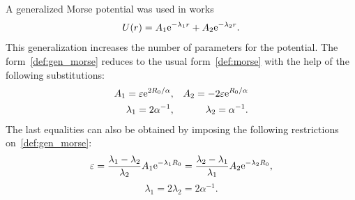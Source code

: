 \documentclass[12pt]{article}
\begin{document}
	A generalized Morse potential was used in works~\cite{BiswasHamann1985, Lim2005}
	\begin{equation}
		\label{def:gen_morse}
		U(r) = A_1 {\rm e}^{-\lambda_1 r} + A_2 {\rm e}^{-\lambda_2 r}.
	\end{equation}
	This generalization increases the number of parameters for the potential. The form~\eqref{def:gen_morse} reduces to the usual form~\eqref{def:morse} with the help of the following substitutions:
	\begin{eqnarray*}
		A_1 = \varepsilon {\rm e}^{2R_0/\alpha}, & & A_2 = -2\varepsilon {\rm e}^{R_0/\alpha}
		\\
		\lambda_1 = 2\alpha^{-1}, & & \lambda_2 = \alpha^{-1}.
	\end{eqnarray*}
	The last equalities can also be obtained by imposing the following restrictions on~\eqref{def:gen_morse}:
	\begin{equation*}
		\varepsilon = \frac{\lambda_1 - \lambda_2}{\lambda_2} A_1 {\rm e}^{-\lambda_1 R_0}
		= \frac{\lambda_2 - \lambda_1}{\lambda_1} A_2 {\rm e}^{-\lambda_2 R_0},		
	\end{equation*}
	\begin{equation}
		\lambda_1 = 2\lambda_2 = 2\alpha^{-1}.
	\end{equation}
	
	
	
	
\end{document}
